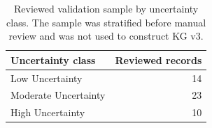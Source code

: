 \begin{table}[t]
\centering
\small
\caption{Reviewed validation sample by uncertainty class. The sample was stratified before manual review and was not used to construct KG v3.}
\label{tab:validation_by_uncertainty}
\begin{tabular}{lr}
\toprule
Uncertainty class & Reviewed records \\
\midrule
Low Uncertainty & 14 \\
Moderate Uncertainty & 23 \\
High Uncertainty & 10 \\
\bottomrule
\end{tabular}
\end{table}
